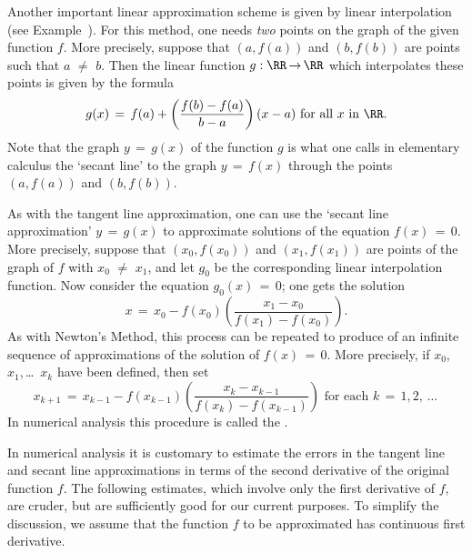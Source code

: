        Another important linear approximation scheme is given by linear interpolation (see Example~).
    For this method, one needs {\em two} points on the graph of the given function $f$.
    More precisely, suppose that $(a,f(a))$ and $(b,f(b))$ are points such that $a \,\,{\neq}\,\, b$.
    Then the linear function $g:{\RR} \,{\rightarrow}\, {\RR}$ which interpolates these points is given by the formula
        \begin{displaymath}
        g(x) \,=\, f(a) + \left(\frac{f(b)-f(a)}{b-a}\right)(x-a) \mbox{ for all $x$ in ${\RR}$}.
        \end{displaymath}
    Note that the graph $y \,=\, g(x)$ of the function $g$ is what one calls in elementary calculus
    the `secant line' to the graph $y \,=\, f(x)$ through the points $(a,f(a))$ and $(b,f(b))$.

        As with the tangent line approximation, one can use the `secant line approximation'
    $y \,=\, g(x)$ to approximate solutions of the equation $f(x) \,=\, 0$. More precisely,
    suppose that $(x_{0},f(x_{0}))$ and $(x_{1},f(x_{1}))$ are points of the graph of $f$ with $x_{0} \,\,{\neq}\,\, x_{1}$,
    and let $g_{0}$ be the corresponding linear interpolation function. Now consider the equation $g_{0}(x) \,=\, 0$; one gets the solution
        \begin{displaymath}
        x \,=\, x_{0} - f(x_{0})\left(\frac{x_{1}-x_{0}}{f(x_{1})-f(x_{0})}\right).
        \end{displaymath}
    As with Newton's Method, this process can be repeated to produce of an infinite sequence of approximations of the solution of $f(x) \,=\, 0$.
    More precisely, if $x_{0}$, $x_{1}$,\,{\ldots}\, $x_{k}$ have been defined, then set
        \begin{displaymath}
        x_{k+1} \,=\, x_{k-1} - f(x_{k-1})\left(\frac{x_{k}-x_{k-1}}{f(x_{k}) - f(x_{k-1})}\right) \mbox{ for each $k \,=\, 1,2,\,{\ldots}\,$}
        \end{displaymath}
    In numerical analysis this procedure is called the {\bf {}}.

\VV

        In numerical analysis it is customary to estimate the errors in the tangent line and secant line approximations in terms of the second derivative of the original function $f$.
    The following estimates, which involve only the first derivative of $f$, are cruder, but are sufficiently good for our current purposes.
    To simplify the discussion, we assume that the function $f$ to be approximated has continuous first derivative.

